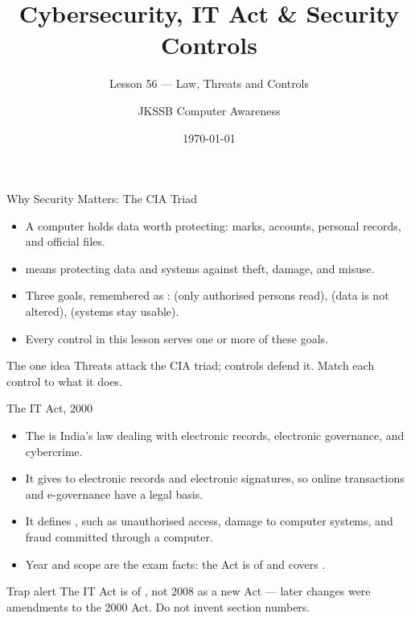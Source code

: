 \documentclass[aspectratio=169]{beamer}
\title{Cybersecurity, IT Act \& Security Controls}
\subtitle{Lesson 56 --- Law, Threats and Controls}
\author{JKSSB Computer Awareness}
\date{\today}
\begin{document}
\frame{\titlepage}

\begin{frame}{Why Security Matters: The CIA Triad}
  \begin{itemize}
    \item A computer holds data worth protecting: marks, accounts,
      personal records, and official files.
    \item {} means protecting data and systems against theft,
      damage, and misuse.
    \item Three goals, remembered as : 
      (only authorised persons read),  (data is not
      altered),  (systems stay usable).
    \item Every control in this lesson serves one or more of these goals.
  \end{itemize}
  \begin{block}{The one idea}
    Threats attack the CIA triad; controls defend it. Match each control
    to what it does.
  \end{block}
\end{frame}

\begin{frame}{The IT Act, 2000}
  \begin{itemize}
    \item The  is India's law dealing
      with electronic records, electronic governance, and cybercrime.
    \item It gives  to electronic records and electronic
      signatures, so online transactions and e-governance have a legal basis.
    \item It defines , such as
      unauthorised access, damage to computer systems, and fraud committed
      through a computer.
    \item Year and scope are the exam facts: the Act is of  and
      covers .
  \end{itemize}
  \begin{alertblock}{Trap alert}
    The IT Act is of , not 2008 as a new Act --- later changes
    were amendments to the 2000 Act. Do not invent section numbers.
  \end{alertblock}
\end{frame}
\end{document}
